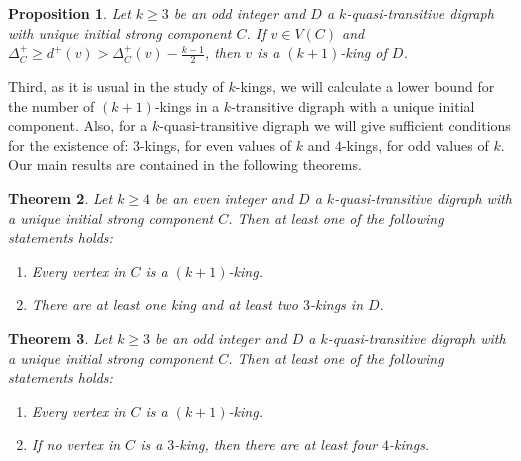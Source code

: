 \documentclass[preprint]{elsarticle}
\newtheorem{thm}{Theorem}[section]
\newtheorem{prop}[thm]{Proposition}
\begin{document}
\begin{prop} \label{exis-deg-odd-prop}
Let $k \ge 3$ be an odd integer and $D$ a $k$-quasi-transitive digraph with unique initial strong component $C$.   If $v \in V(C)$ and $\Delta_C^+ \ge d^+ (v) > \Delta_C^+ (v) - \frac{k-1}{2}$, then $v$ is a $(k+1)$-king of $D$.
\end{prop}

Third, as it is usual in the study of $k$-kings, we will calculate a lower bound for the number of $(k+1)$-kings in a $k$-transitive digraph with a unique initial component.   Also, for a $k$-quasi-transitive digraph we will give sufficient conditions for the existence of: $3$-kings, for even values of $k$ and $4$-kings, for odd values of $k$.   Our main results are contained in the following theorems.

\begin{thm} \label{main-even}
Let $k \ge 4$ be an even integer and $D$ a $k$-quasi-transitive digraph with a unique initial strong component $C$.   Then at least one of the following statements holds:
\begin{enumerate}
	\item Every vertex in $C$ is a $(k+1)$-king.
	
	\item There are at least one king and at least two $3$-kings in $D$.
\end{enumerate}
\end{thm}


\begin{thm} \label{main-odd}
Let $k \ge 3$ be an odd integer and $D$ a $k$-quasi-transitive digraph with a unique initial strong component $C$.   Then at least one of the following statements holds:
\begin{enumerate}
	\item Every vertex in $C$ is a $(k+1)$-king.
	
	\item If no vertex in $C$ is a $3$-king, then there are at least four $4$-kings.
\end{enumerate}
\end{thm}
\end{document}
